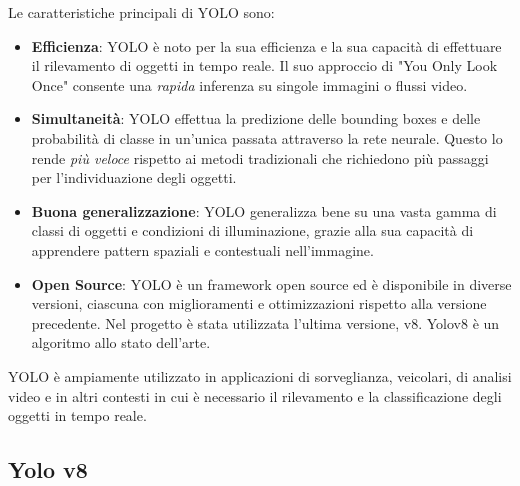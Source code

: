 \documentclass{report}
\begin{document}
Le caratteristiche principali di YOLO sono:
\begin{itemize}

\item
\textbf{Efficienza}: YOLO è noto per la sua efficienza e la sua capacità di effettuare il rilevamento di oggetti in tempo reale. Il suo approccio di "You Only Look Once" consente una {\itshape rapida} inferenza su singole immagini o flussi video.
\item
\textbf{Simultaneità}: YOLO effettua la predizione delle bounding boxes e delle probabilità di classe in un'unica passata attraverso la rete neurale. Questo lo rende {\itshape più veloce} rispetto ai metodi tradizionali che richiedono più passaggi per l'individuazione degli oggetti.

\item
\textbf{Buona generalizzazione}: YOLO generalizza bene su una vasta gamma di classi di oggetti e condizioni di illuminazione, grazie alla sua capacità di apprendere pattern spaziali e contestuali nell'immagine.

\item
\textbf{Open Source}: YOLO è un framework open source ed è disponibile in diverse versioni, ciascuna con miglioramenti e ottimizzazioni rispetto alla versione precedente. Nel progetto è stata utilizzata l'ultima versione, v8. Yolov8 è un algoritmo allo stato dell'arte.

\end{itemize}
YOLO è ampiamente utilizzato in applicazioni di sorveglianza, veicolari, di analisi video e in altri contesti in cui è necessario il rilevamento e la classificazione degli oggetti in tempo reale.

\subsection{Yolo v8}
\end{document}
